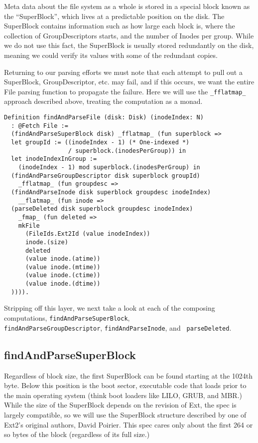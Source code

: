 \documentclass[nocopyrightspace]{sigplanconf}
\begin{document}
Meta data about the file system as a whole is stored in a special block known
as the ``SuperBlock'', which lives at a predictable position on the disk. The
SuperBlock contains information such as how large each block is, where the
collection of GroupDescriptors starts, and the number of Inodes per group.
While we do not use this fact, the SuperBlock is usually stored redundantly on
the disk, meaning we could verify its values with some of the redundant
copies.

Returning to our parsing efforts we must note that each attempt to pull out a
SuperBlock, GroupDescriptor, etc. may fail, and if this occurs, we want the
entire File parsing function to propagate the failure. Here we will use the
{\tt \_fflatmap\_} approach described above, treating the computation as a
monad.

\begin{lstlisting}
Definition findAndParseFile (disk: Disk) (inodeIndex: N) 
  : @Fetch File :=
  (findAndParseSuperBlock disk) _fflatmap_ (fun superblock =>
  let groupId := ((inodeIndex - 1) (* One-indexed *)
                  / superblock.(inodesPerGroup)) in
  let inodeIndexInGroup := 
    (inodeIndex - 1) mod superblock.(inodesPerGroup) in
  (findAndParseGroupDescriptor disk superblock groupId) 
    _fflatmap_ (fun groupdesc =>
  (findAndParseInode disk superblock groupdesc inodeIndex) 
    __flatmap_ (fun inode =>
  (parseDeleted disk superblock groupdesc inodeIndex) 
    _fmap_ (fun deleted =>
    mkFile
      (FileIds.Ext2Id (value inodeIndex))
      inode.(size)
      deleted
      (value inode.(atime))
      (value inode.(mtime))
      (value inode.(ctime))
      (value inode.(dtime))
  )))).
\end{lstlisting}

Stripping off this layer, we next take a look at each of the composing
computations, {\tt findAndParseSuperBlock}, \\
{\tt findAndParseGroupDescriptor}, {\tt findAndParseInode}, and {\tt
parseDeleted}.

\subsection{findAndParseSuperBlock}

Regardless of block size, the first SuperBlock can be found starting at the
1024th byte. Below this position is the boot sector, executable code that
loads prior to the main operating system (think boot loaders like LILO, GRUB,
and MBR.) While the size of the SuperBlock depends on the revision of Ext, the
spec is largely compatible, so we will use the SuperBlock structure described
by one of Ext2's original authors, David Poirier\cite{non-gnu}. This spec
cares only about the first 264 or so bytes of the block (regardless of its
full size.)
\end{document}
